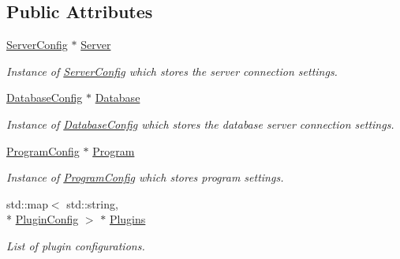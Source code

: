 \subsection*{Public Attributes}
\begin{DoxyCompactItemize}
\item 
\hypertarget{classConfig_a249a19a298cdcfd4223609142e15e5de}{\hyperlink{structServerConfig}{Server\-Config} $\ast$ \hyperlink{classConfig_a249a19a298cdcfd4223609142e15e5de}{Server}}\label{classConfig_a249a19a298cdcfd4223609142e15e5de}

\begin{DoxyCompactList}\small\item\em Instance of \hyperlink{structServerConfig}{Server\-Config} which stores the server connection settings. \end{DoxyCompactList}\item 
\hypertarget{classConfig_a7c1bdf72973da53666514dbd549cc400}{\hyperlink{structDatabaseConfig}{Database\-Config} $\ast$ \hyperlink{classConfig_a7c1bdf72973da53666514dbd549cc400}{Database}}\label{classConfig_a7c1bdf72973da53666514dbd549cc400}

\begin{DoxyCompactList}\small\item\em Instance of \hyperlink{structDatabaseConfig}{Database\-Config} which stores the database server connection settings. \end{DoxyCompactList}\item 
\hypertarget{classConfig_a2dea7bf45e7c8a8d2461a121b56504b3}{\hyperlink{structProgramConfig}{Program\-Config} $\ast$ \hyperlink{classConfig_a2dea7bf45e7c8a8d2461a121b56504b3}{Program}}\label{classConfig_a2dea7bf45e7c8a8d2461a121b56504b3}

\begin{DoxyCompactList}\small\item\em Instance of \hyperlink{structProgramConfig}{Program\-Config} which stores program settings. \end{DoxyCompactList}\item 
\hypertarget{classConfig_af02b6ade87bcdd8368788283e42a6b74}{std\-::map$<$ std\-::string, \\*
\hyperlink{structPluginConfig}{Plugin\-Config} $>$ $\ast$ \hyperlink{classConfig_af02b6ade87bcdd8368788283e42a6b74}{Plugins}}\label{classConfig_af02b6ade87bcdd8368788283e42a6b74}

\begin{DoxyCompactList}\small\item\em List of plugin configurations. \end{DoxyCompactList}\end{DoxyCompactItemize}
